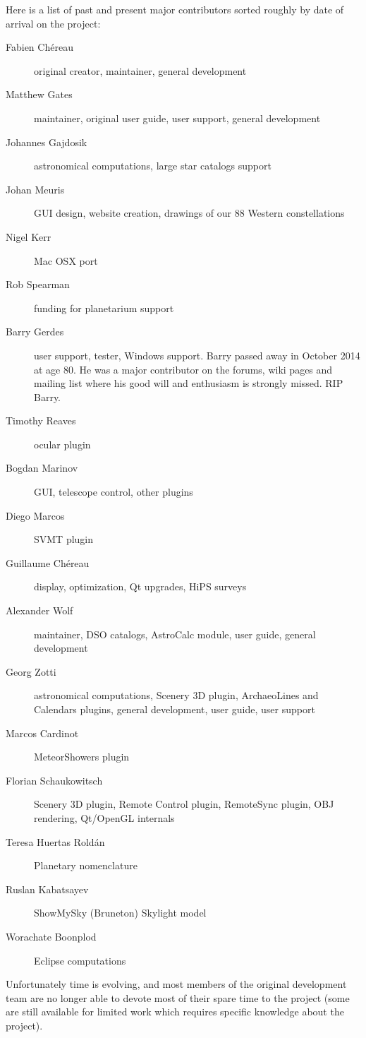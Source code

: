 Here is a list of past and present major contributors sorted roughly by date of
arrival on the project:
\newpage
\begin{description}
\item[Fabien Ch\'ereau] original creator, maintainer, general development
\item[Matthew Gates] maintainer, original user guide, user support, general development
\item[Johannes Gajdosik] astronomical computations, large star catalogs support
\item[Johan Meuris] GUI design, website creation, drawings of our 88 Western constellations
\item[Nigel Kerr] Mac OSX port
\item[Rob Spearman] funding for planetarium support
\item[Barry Gerdes] user support, tester, Windows support. Barry
  passed away in October 2014 at age 80. He was a major contributor on
  the forums, wiki pages and mailing list where his good will and
  enthusiasm is strongly missed.  RIP Barry.
\item[Timothy Reaves] ocular plugin
\item[Bogdan Marinov] GUI, telescope control, other plugins
\item[Diego Marcos] SVMT plugin
\item[Guillaume Ch\'ereau] display, optimization, Qt upgrades, HiPS surveys
\item[Alexander Wolf] maintainer, DSO catalogs, AstroCalc module, user guide, general development
\item[Georg Zotti] astronomical computations, Scenery 3D plugin, ArchaeoLines and Calendars plugins, general development, user guide, user support
\item[Marcos Cardinot] MeteorShowers plugin
\item[Florian Schaukowitsch] Scenery 3D plugin, Remote Control plugin, RemoteSync plugin, OBJ rendering, Qt/OpenGL internals
\item[Teresa Huertas Rold\'an] Planetary nomenclature 
\item[Ruslan Kabatsayev] ShowMySky (Bruneton) Skylight model
\item[Worachate Boonplod] Eclipse computations
\end{description}

Unfortunately time is evolving, and most members of the original
development team are no longer able to devote most of their spare time
to the project (some are still available for limited work
which requires specific knowledge about the project).

